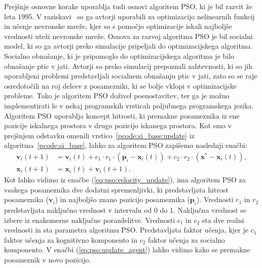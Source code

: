 Prejšnje osnovne korake uporablja tudi osnovi algoritem PSO, ki je bil razvit že leta 1995.
V raziskavi~\cite{alg:pso} so ga avtorji uporabili za optimizacijo nelinearnih funkcij in učenje nevronske mreže, kjer so s pomočjo optimizacije iskali najboljše vrednosti uteži nevronske mreže.
Osnova za razvoj algoritma PSO je bil socialni model, ki so ga avtorji preko simulacije pripeljali do optimizacijskega algoritma.
Socialno obnašanje, ki je pripomoglo do optimizacijskega algoritma je bilo obnašanje ptic v jati.
Avtorji so preko simulacij prepoznali zahtevnosti, ki so jih uporabljeni problemi predstavljali socialnem obnašanju ptic v jati, zato so se raje osredotočili na roj delcev z posamezniki, ki se bolje vklopi v optimizacijske probleme.
Tako je algoritem PSO doživel poenostavitev, ter ga je možno implementirati le v nekaj programskih vrsticah poljubnega programskega jezika.
Algoritem PSO uporablja koncept hitrosti, ki premakne posameznika iz ene pozicije iskalnega prostora v drugo pozicijo iskanega prostora.
Kot smo v prejšnjem odstavku omenili vrstico~\ref{pcode:si_base:update} iz algoritma~\ref{pcode:si_base}, lahko za algoritem PSO zapišemo naslednji enačbi:
\begin{align}
    \mathbf{v}_i(t + 1) &= \mathbf{v}_i(t) + c_1 \cdot r_1 \cdot (\mathbf{p}_i - \mathbf{x}_i(t)) + c_2 \cdot r_2 \cdot (\mathbf{x}^* - \mathbf{x}_i(t)),\label{eq:pso:velocity_update} \\
	\mathbf{x}_i(t + 1) &= \mathbf{x}_i(t) + \mathbf{v}_i(t + 1). \label{eq:pso:update_agent}
\end{align}
Kot lahko vidimo iz enačbe (\ref{eq:pso:velocity_update}), ima algoritem PSO za vsakega posameznika dve dodatni spremenljivki, ki predstavljata hitrost posameznika ($\mathbf{v}_i$) in najboljšo znano pozicijo posameznika ($\mathbf{p}_i$).
Vrednosti $r_1$ in $r_2$ predstavljata naključno vrednost v intervalu od $0$ do $1$.
Naključna vrednost se izbere iz enakomerne naključne porazdelitve.
Vrednosti $c_1$ in $c_2$ sta dve realni vrednosti in sta parametra algoritmu PSO.
Predstavljata faktor učenja, kjer je $c_1$ faktor učenja za kognitivno komponento in $c_2$ faktor učenja za socialno komponento.
V enačbi (\ref{eq:pso:update_agent}) lahko vidimo kako se premakne posameznik v novo pozicijo.

